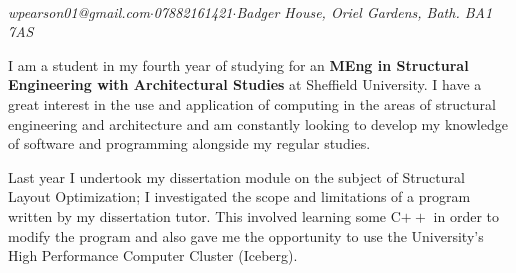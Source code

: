 \documentclass[oneside,a4paper]{article}
\begin{document}
\immediate{}


\\

\noindent \textit{wpearson01@gmail.com\hspace{5mm}$\cdot$\hspace{5mm}07882161421\hspace{5mm}$\cdot$\hspace{5mm}Badger House, Oriel Gardens, Bath. BA1 7AS}

\small
\vspace{0.5cm}
%


I am a student in my fourth year of studying for an \textbf{MEng in Structural Engineering with Architectural Studies} at Sheffield University. I have a great interest in the use and application of computing in the areas of structural engineering and architecture and am constantly looking to develop my knowledge of software and programming alongside my regular studies.

Last year I undertook my dissertation module on the subject of Structural Layout Optimization; I investigated the scope and limitations of a program written by my dissertation tutor. This involved learning some C$++$ in order to modify the program and also gave me the opportunity to use the University's High Performance Computer Cluster (Iceberg).
\end{document}
